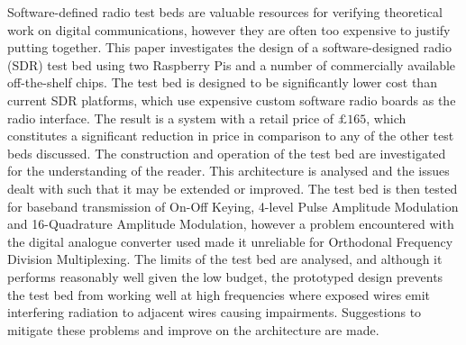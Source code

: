 \documentclass[../main.tex]{subfiles}
\begin{document}
\noindent
Software-defined radio test beds are valuable resources for verifying theoretical work on digital communications, however they are often too expensive to justify putting together. This paper investigates the design of a software-designed radio (SDR) test bed using two Raspberry Pis and a number of commercially available off-the-shelf chips.
The test bed is designed to be significantly lower cost than current SDR platforms, which use expensive custom software radio boards as the radio interface.
The result is a system with a retail price of $\mathsterling165$, which constitutes a significant reduction in price in comparison to any of the other test beds discussed.
The construction and operation of the test bed are investigated for the understanding of the reader.
This architecture is analysed and the issues dealt with such that it may be extended or improved.
The test bed is then tested for baseband transmission of On-Off Keying, 4-level Pulse Amplitude Modulation and 16-Quadrature Amplitude Modulation, however a problem encountered with the digital analogue converter used made it unreliable for Orthodonal Frequency Division Multiplexing.
The limits of the test bed are analysed, and although it performs reasonably well given the low budget, the prototyped design prevents the test bed from working well at high frequencies where exposed wires emit interfering radiation to adjacent wires causing impairments.
Suggestions to mitigate these problems and improve on the architecture are made.\\

\end{document}
